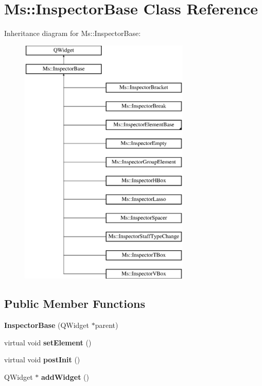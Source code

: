 \hypertarget{class_ms_1_1_inspector_base}{}\section{Ms\+:\+:Inspector\+Base Class Reference}
\label{class_ms_1_1_inspector_base}
Inheritance diagram for Ms\+:\+:Inspector\+Base\+:\begin{figure}[H]
\begin{center}
\leavevmode
\includegraphics[height=12.000000cm]{class_ms_1_1_inspector_base}
\end{center}
\end{figure}
\subsection*{Public Member Functions}
\begin{DoxyCompactItemize}
\item 
\mbox{\label{class_ms_1_1_inspector_base_a3d8e18644892eb5804d51ea112bd84f1}} 
{\bfseries Inspector\+Base} (Q\+Widget $\ast$parent)
\item 
\mbox{\label{class_ms_1_1_inspector_base_afef6efffb31822432b0e14023ebbfbda}} 
virtual void {\bfseries set\+Element} ()
\item 
\mbox{\label{class_ms_1_1_inspector_base_a21bd813fd59fb6b56d2f39e112c628bc}} 
virtual void {\bfseries post\+Init} ()
\item 
\mbox{\label{class_ms_1_1_inspector_base_ac30581df4d37c01c4664110bfd60cd6e}} 
Q\+Widget $\ast$ {\bfseries add\+Widget} ()
\end{DoxyCompactItemize}
